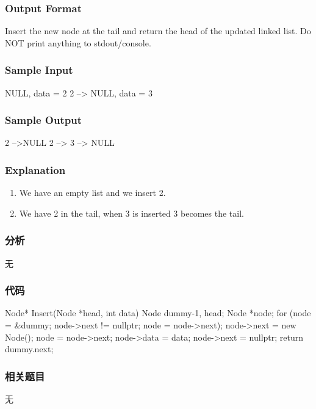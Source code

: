 \subsubsection{Output Format}
Insert the new node at the tail and return the head of the updated linked list. Do NOT print anything to stdout/console.


\subsubsection{Sample Input}
\begin{Code}
NULL, data = 2
2 –> NULL, data = 3
\end{Code}


\subsubsection{Sample Output}
\begin{Code}
2 -->NULL
2 --> 3 --> NULL
\end{Code}


\subsubsection{Explanation}
\begin{enumerate}
\item We have an empty list and we insert 2.
\item We have 2 in the tail, when 3 is inserted 3 becomes the tail.
\end{enumerate}


\subsubsection{分析}
无


\subsubsection{代码}
\begin{Code}
Node* Insert(Node *head, int data) {
    Node dummy{-1, head};
    Node *node;
    for (node = &dummy; node->next != nullptr; node = node->next);
    node->next = new Node();
    node = node->next;
    node->data = data;
    node->next = nullptr;
    return dummy.next;
}
\end{Code}


\subsubsection{相关题目}
\begindot
\item 无
\myenddot


